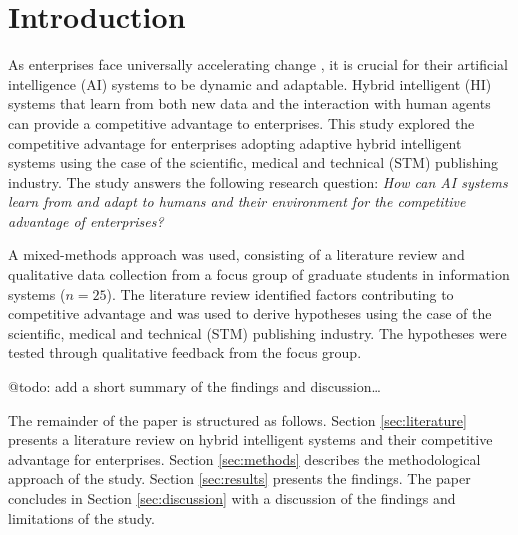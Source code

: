 \section{Introduction}
\label{sec:introduction}

As enterprises face universally accelerating change \citep{eliazarUniversalityAcceleratingChange2018}, it
is crucial for their artificial intelligence (AI) systems to be dynamic and adaptable. Hybrid intelligent (HI)
systems that learn from both new data and the interaction with human agents can provide a competitive advantage
to enterprises. This study explored the competitive advantage for enterprises adopting adaptive hybrid intelligent
systems using the case of the scientific, medical and technical (STM) publishing industry. The study answers the
following research question: \textit{How can AI systems learn from and adapt to humans and their environment
for the competitive advantage of enterprises?}

A mixed-methods approach was used, consisting of a literature review and qualitative data collection from
a focus group of graduate students in information systems ($n = 25$). The literature review identified factors
contributing to competitive advantage and was used to derive hypotheses using the case of the scientific,
medical and technical (STM) publishing industry. The hypotheses were tested through qualitative feedback
from the focus group.

{\color{purple} @todo: add a short summary of the findings and discussion\dots}

The remainder of the paper is structured as follows. Section \ref{sec:literature} presents a literature review
on hybrid intelligent systems and their competitive advantage for enterprises. Section \ref{sec:methods} describes
the methodological approach of the study. Section \ref{sec:results} presents the findings. The paper concludes in
Section \ref{sec:discussion} with a discussion of the findings and limitations of the study.